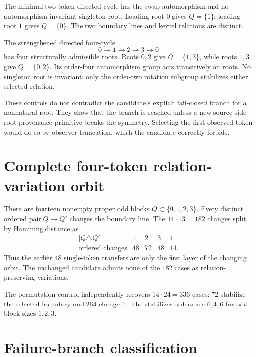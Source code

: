\documentclass[11pt]{article}
\begin{document}
The minimal two-token directed cycle has the swap automorphism and no
automorphism-invariant singleton root. Loading root \(0\) gives
\(Q=\{1\}\); loading root \(1\) gives \(Q=\{0\}\). The two boundary lines and
kernel relations are distinct.

The strengthened directed four-cycle
\[
  0\longrightarrow1\longrightarrow2\longrightarrow3\longrightarrow0
\]
has four structurally admissible roots. Roots \(0,2\) give
\(Q=\{1,3\}\), while roots \(1,3\) give \(Q=\{0,2\}\). Its order-four
automorphism group acts transitively on roots. No singleton root is invariant;
only the order-two rotation subgroup stabilizes either selected relation.

These controls do not contradict the candidate's explicit fail-closed branch
for a nonnatural root. They show that the branch is reached unless a new
source-side root-provenance primitive breaks the symmetry. Selecting the first
observed token would do so by observer truncation, which the candidate
correctly forbids.

\section{Complete four-token relation-variation orbit}

There are fourteen nonempty proper odd blocks \(Q\subset\{0,1,2,3\}\).
Every distinct ordered pair \(Q\to Q'\) changes the boundary line. The
\(14\cdot13=182\) changes split by Hamming distance as
\[
\begin{array}{c|rrrr}
|Q\triangle Q'| & 1 & 2 & 3 & 4\\
\hline
\text{ordered changes} & 48 & 72 & 48 & 14.
\end{array}
\]
Thus the earlier \(48\) single-token transfers are only the first layer of
the changing orbit. The unchanged candidate admits none of the \(182\) cases
as relation-preserving variations.

The permutation control independently recovers \(14\cdot24=336\) cases:
\(72\) stabilize the selected boundary and \(264\) change it. The stabilizer
orders are \(6,4,6\) for odd-block sizes \(1,2,3\).

\section{Failure-branch classification}
\end{document}
